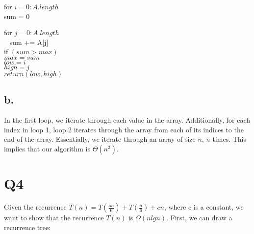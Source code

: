\documentclass[12pt]{article}
\begin{document}
for  $i = 0:A.length$\\
\indent sum = 0 


\indent \indent for $j = 0:A.length$\\ \
\indent \indent \indent
sum += A[j] \\
\indent \indent \indent
if $(sum > max)$ \\
\indent \indent \indent \indent
$max = sum$ \\
\indent \indent \indent \indent
$low = i $\\
\indent \indent \indent \indent
$high = j$ \\
\indent
$return(low, high)$ 
\setlength{\parindent}{0pt}

\subsection{b.}
In the first loop, we iterate through each value in the array. Additionally, for each index in loop 1, loop 2 iterates through the array from each of its indices to the end of the array. Essentially, we iterate through an array of size $n$, $n$ times. This implies that our algorithm is $\Theta(n^2)$.


\section{Q4}

Given the recurrence $T(n) = T(\frac{5n}{6}) + T(\frac{n}{6}) + cn$, where c is a constant, we want to show that the recurrence $T(n)$ is $\Omega(nlgn)$. First, we can draw a recurrence tree:
\end{document}

